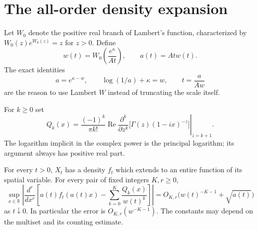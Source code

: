 \section{The all-order density expansion}

Let $W_0$ denote the positive real branch of Lambert's function,
characterized by $W_0(z)e^{W_0(z)}=z$ for $z>0$. Define
\begin{equation}\label{eq:generic-scale}
 w(t)=W_0\left(\frac{e^\kappa}{At}\right),\qquad
 a(t)=Atw(t).
\end{equation}
The exact identities
\begin{equation}\label{eq:scale-identities}
 a=e^{\kappa-w},\qquad \log(1/a)+\kappa=w,
 \qquad t=\frac{a}{Aw}
\end{equation}
are the reason to use Lambert $W$ instead of truncating the scale itself.

For $k\geq0$ set
\begin{equation}\label{eq:universal-profiles}
 Q_k(x)=\frac{(-1)^k}{\pi k!}\operatorname{Re}
 \left.
 \frac{\partial^k}{\partial z^k}
       \bigl[\Gamma(z)(1-ix)^{-z}\bigr]
 \right|_{z=k+1}.
\end{equation}
The logarithm implicit in the complex power is the principal logarithm;
its argument always has positive real part.

\begin{theorem}
\label{thm:all-orders}
For every $t>0$, $X_t$ has a density $f_t$ which extends to an entire
function of its spatial variable. For every pair of fixed integers
$K,r\geq0$,
\begin{equation}\label{eq:all-order-bound}
 \sup_{x\in\mathbb R}
 \left|
 \frac{d^r}{dx^r}
 \left[a(t)f_t(a(t)x)-\sum_{k=0}^K\frac{Q_k(x)}{w(t)^k}\right]
 \right|
 =O_{K,r}\bigl(w(t)^{-K-1}+\sqrt{a(t)}\bigr)
\end{equation}
as $t\downarrow0$. In particular the error is $O_{K,r}(w^{-K-1})$.
The constants may depend on the multiset and its counting estimate.
\end{theorem}

